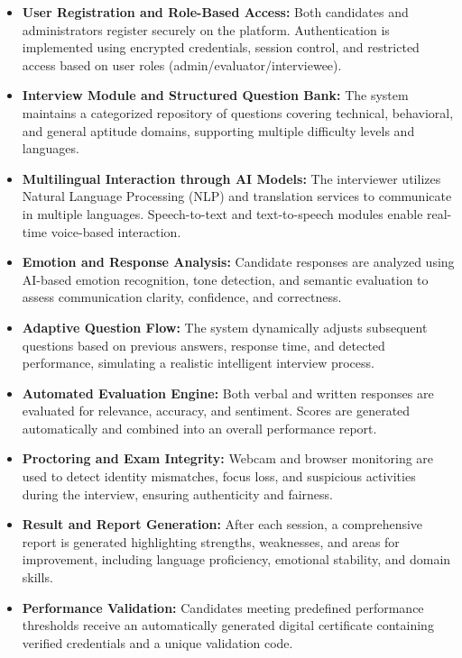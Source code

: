 \documentclass[12pt]{article}
\begin{document}
\begin{itemize}

\item \textbf{User Registration and Role-Based Access:}
Both candidates and administrators register securely on the platform. Authentication is implemented using encrypted credentials, session control, and restricted access based on user roles (admin/evaluator/interviewee).

\item \textbf{Interview Module and Structured Question Bank:}
The system maintains a categorized repository of questions covering technical, behavioral, and general aptitude domains, supporting multiple difficulty levels and languages.

\item \textbf{Multilingual Interaction through AI Models:}
The interviewer utilizes Natural Language Processing (NLP) and translation services to communicate in multiple languages. Speech-to-text and text-to-speech modules enable real-time voice-based interaction.

\item \textbf{Emotion and Response Analysis:}
Candidate responses are analyzed using AI-based emotion recognition, tone detection, and semantic evaluation to assess communication clarity, confidence, and correctness.

\item \textbf{Adaptive Question Flow:}
The system dynamically adjusts subsequent questions based on previous answers, response time, and detected performance, simulating a realistic intelligent interview process.

\item \textbf{Automated Evaluation Engine:}
Both verbal and written responses are evaluated for relevance, accuracy, and sentiment. Scores are generated automatically and combined into an overall performance report.

\item \textbf{Proctoring and Exam Integrity:}
Webcam and browser monitoring are used to detect identity mismatches, focus loss, and suspicious activities during the interview, ensuring authenticity and fairness.

\item \textbf{Result and Report Generation:}
After each session, a comprehensive report is generated highlighting strengths, weaknesses, and areas for improvement, including language proficiency, emotional stability, and domain skills.

\item \textbf{Performance Validation:}
Candidates meeting predefined performance thresholds receive an automatically generated digital certificate containing verified credentials and a unique validation code.

\end{itemize}
\newpage
\end{document}
